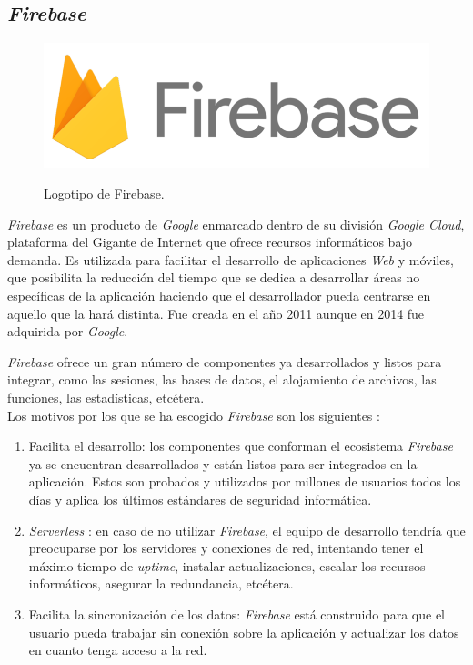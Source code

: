 \documentclass[twoside]{report}
\begin{document}
\subsection{\textit{Firebase}}
\label{firebase}

\begin{figure}[H]
\centering
\includegraphics[scale=0.3]{images/firebase}\\
\caption{Logotipo de Firebase.} \cite{firebase}
\end{figure}


\textit{Firebase} es un producto de \textit{Google} enmarcado dentro de su división \textit{Google Cloud}, plataforma del Gigante de Internet que ofrece recursos informáticos bajo demanda. Es utilizada para facilitar el desarrollo de aplicaciones \textit{Web} y móviles, que posibilita la reducción del tiempo que se dedica a desarrollar áreas no específicas de la aplicación haciendo que el desarrollador pueda centrarse en aquello que la hará distinta. Fue creada en el año 2011 aunque en 2014 fue adquirida por \textit{Google}.

\textit{Firebase} ofrece un gran número de componentes ya desarrollados y listos para integrar, como las sesiones, las bases de datos, el alojamiento de archivos, las funciones, las estadísticas, etcétera.\\

Los motivos por los que se ha escogido \textit{Firebase} son los siguientes \cite{firebaseadvdis}:

\begin{enumerate}

\item Facilita el desarrollo: los componentes que conforman el ecosistema \textit{Firebase} ya se encuentran desarrollados y están listos para ser integrados en la aplicación. Estos son probados y utilizados por millones de usuarios todos los días y aplica los últimos estándares de seguridad informática.

\item \textit{Serverless} : en caso de no utilizar \textit{Firebase}, el equipo de desarrollo tendría que preocuparse por los servidores y conexiones de red, intentando tener el máximo tiempo de \textit{uptime}, instalar actualizaciones, escalar los recursos informáticos, asegurar la redundancia, etcétera.

\item Facilita la sincronización de los datos: \textit{Firebase} está construido para que el usuario pueda trabajar sin conexión sobre la aplicación y actualizar los datos en cuanto tenga acceso a la red.
\end{enumerate}
\end{document}
